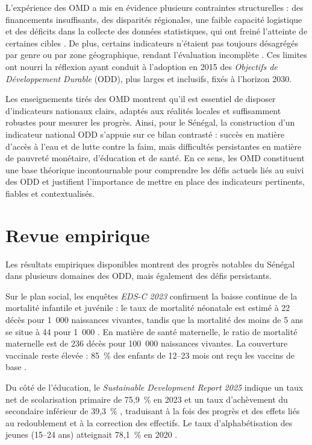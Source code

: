 L’expérience des OMD a mis en évidence plusieurs contraintes structurelles : des financements insuffisants, des disparités régionales, une faible capacité logistique et des déficits dans la collecte des données statistiques, qui ont freiné l’atteinte de certaines cibles \autocite{ipar2015}. De plus, certains indicateurs n’étaient pas toujours désagrégés par genre ou par zone géographique, rendant l’évaluation incomplète \autocite{eca2015}. Ces limites ont nourri la réflexion ayant conduit à l’adoption en 2015 des \textit{Objectifs de Développement Durable} (ODD), plus larges et inclusifs, fixés à l’horizon 2030.

Les enseignements tirés des OMD montrent qu’il est essentiel de disposer d’indicateurs nationaux clairs, adaptés aux réalités locales et suffisamment robustes pour mesurer les progrès. Ainsi, pour le Sénégal, la construction d’un indicateur national ODD s’appuie sur ce bilan contrasté : succès en matière d’accès à l’eau et de lutte contre la faim, mais difficultés persistantes en matière de pauvreté monétaire, d’éducation et de santé. En ce sens, les OMD constituent une base théorique incontournable pour comprendre les défis actuels liés au suivi des ODD et justifient l’importance de mettre en place des indicateurs pertinents, fiables et contextualisés.

\section{Revue empirique}

Les résultats empiriques disponibles montrent des progrès notables du Sénégal dans plusieurs domaines des ODD, mais également des défis persistants.

Sur le plan social, les enquêtes \textit{EDS-C 2023} confirment la baisse continue de la mortalité infantile et juvénile : le taux de mortalité néonatale est estimé à 22 décès pour 1~000 naissances vivantes, tandis que la mortalité des moins de 5 ans se situe à 44 pour 1~000 \autocite{ANSD_EDSC_2023}. En matière de santé maternelle, le ratio de mortalité maternelle est de 236 décès pour 100~000 naissances vivantes. La couverture vaccinale reste élevée : 85~\% des enfants de 12–23 mois ont reçu les vaccins de base \autocite{ANSD_EDSC_2023}.

Du côté de l’éducation, le \textit{Sustainable Development Report 2025} indique un taux net de scolarisation primaire de 75,9~\% en 2023 et un taux d’achèvement du secondaire inférieur de 39,3~\% \autocite{SDR2025}, traduisant à la fois des progrès et des effets liés au redoublement et à la correction des effectifs. Le taux d’alphabétisation des jeunes (15–24 ans) atteignait 78,1~\% en 2020 \autocite{ANSD_EDSC_2023}.

